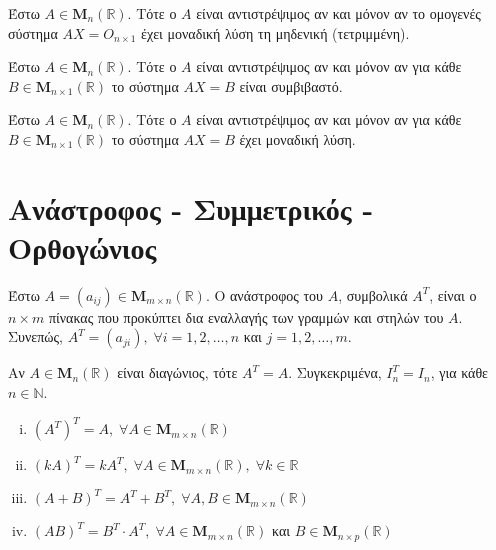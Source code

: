 \begin{thm}
  Έστω $ A \in \textbf{M}_{n}(\mathbb{R}) $. Τότε ο $A$ είναι αντιστρέψιμος αν και 
  μόνον αν το ομογενές σύστημα $ AX=Ο_{n\times 1} $ έχει μοναδική λύση τη μηδενική 
  (τετριμμένη).
\end{thm}

\begin{thm}
  Έστω $ A \in \textbf{M}_{n}(\mathbb{R}) $. Τότε ο $A$ είναι αντιστρέψιμος αν και 
  μόνον αν για κάθε $ B \in \textbf{M}_{n\times 1}(\mathbb{R}) $ το σύστημα 
  $ AX=B $ είναι συμβιβαστό.
\end{thm}

\begin{thm}
  Έστω $ A \in \textbf{M}_{n}(\mathbb{R}) $. Τότε ο $A$ είναι αντιστρέψιμος αν και 
  μόνον αν για κάθε $ B \in \textbf{M}_{n\times 1}(\mathbb{R}) $ το σύστημα 
  $ AX=B $ έχει μοναδική λύση.
\end{thm}

\section*{Ανάστροφος - Συμμετρικός - Ορθογώνιος}

\begin{dfn}
  Έστω $ A = (a_{ij}) \in \textbf{M}_{m \times n}(\mathbb{R}) $. Ο ανάστροφος του $A$, 
  συμβολικά $ A^{T} $, είναι ο $ n \times m $ πίνακας που προκύπτει δια εναλλαγής των
  γραμμών και στηλών του $A$. Συνεπώς, $ A^{T}=(a_{ji}), \; \forall i=1,2,\ldots, n $ 
  και $ j=1,2,\ldots, m $. 
\end{dfn}

\begin{rem}
  Αν $ A \in \textbf{M}_{n}(\mathbb{R}) $ είναι διαγώνιος, τότε $ A^{T}=A $. 
  Συγκεκριμένα, $ I_{n}^{T}=I_{n} $, για κάθε $ n \in \mathbb{N} $. 
\end{rem}

\begin{thm}
\item {}
  \begin{enumerate}[i)]
    \item $ (A^{T})^{T} = A, \; \forall A \in \textbf{M}_{m \times n}(\mathbb{R}) $ 
    \item $ (kA)^{T} = kA^{T}, \; \forall A \in \textbf{M}_{m \times n}(\mathbb{R}), \;
      \forall k \in \mathbb{R} $ 
    \item $ (A+B)^{T} = A^{T}+B^{T}, \; \forall A,B \in \textbf{M}_{m \times
      n}(\mathbb{R}) $ 
    \item $ (AB)^{T} = B^{T}\cdot A^{T}, \; \forall A \in \textbf{M}_{m \times
      n}(\mathbb{R}) $ και $ B \in \textbf{M}_{n \times p}(\mathbb{R}) $
  \end{enumerate}
\end{thm}

